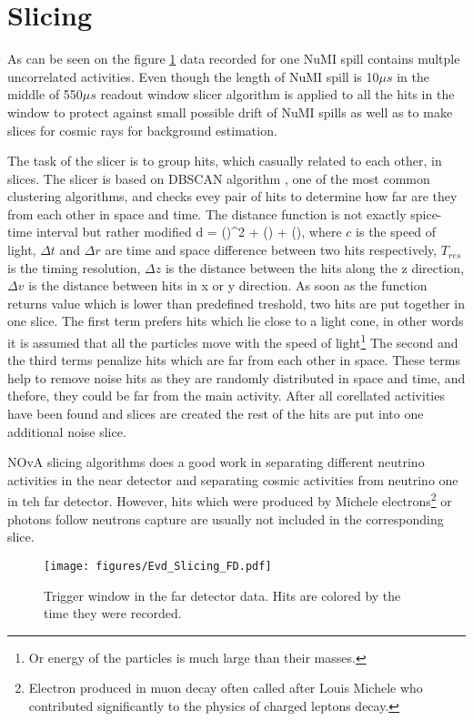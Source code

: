 \section{Slicing}
As can be seen on the figure \ref{fig:EVD_full} data recorded for one NuMI spill contains
multple uncorrelated activities. Even though the length of NuMI spill is 10$\mu s$ in the middle
of 550$\mu s$ readout window slicer algorithm is applied to all the hits in the window to protect 
against small possible drift of NuMI spills as well as to make slices for cosmic rays for background
estimation.

The task of the slicer is to group hits, which casually related to each other, in slices. The slicer 
is based on DBSCAN algorithm \cite{DBSCAN}, one of the most common clustering algorithms, and checks 
evey pair of hits to determine how far are they from each other in space and time. The distance 
function is not exactly spice-time interval but rather modified 
\be
d = \Big(\Big)^2 + \Big(\Big) + 
\Big(\Big),
\ee 
where $c$ is the speed of light, $\Delta t$ and $\Delta r$ are time and space difference between two 
hits respectively, $T_{res}$ is the timing resolution, $\Delta z$ is the distance between the hits
along the z direction, $\Delta v$ is the distance between hits in x or y direction. As soon as the 
function returns value which is lower than predefined treshold, two hits are put together in one slice.
The first term prefers hits which lie close to a light cone, in other words it is assumed that all
the particles move with the speed of light\footnote{Or energy of the particles is much large than their 
masses.} The second and the third terms penalize hits which are far from each other in space. These
terms help to remove noise hits as they are randomly distributed in space and time, and thefore, they 
could be far from the main activity. After all corellated activities have been found and slices are 
created the rest of the hits are put into one additional noise slice.

NOvA slicing algorithms does a good work in separating different neutrino activities in the near detector
and separating cosmic activities from neutrino one in teh far detector. However, hits which were produced
by Michele electrons\footnote{Electron produced in muon decay often called after Louis Michele who
contributed significantly to the physics of charged leptons decay.} or photons follow neutrons capture are
usually not included in the corresponding slice.
\begin{figure}[t]
\texttt{[image: figures/Evd\_Slicing\_FD.pdf]}
\centering
\caption{Trigger window in the far detector data. Hits are colored by the time they were recorded.} 
\label{fig:EVD_full}
\end{figure}

